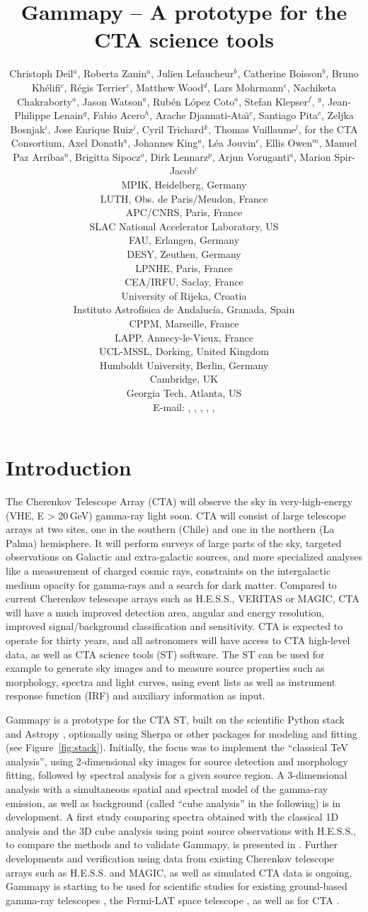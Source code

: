 \documentclass{PoS}
\title{Gammapy -- A prototype for the CTA science tools}
\author{
Christoph Deil$^a$,
Roberta Zanin$^a$,
Julien Lefaucheur$^b$,
Catherine Boisson$^b$,
Bruno Kh\'elifi$^c$,
R\'egis Terrier$^c$,
Matthew Wood$^d$,
Lars Mohrmann$^e$,
Nachiketa Chakraborty$^a$,
Jason Watson$^a$,
Rub\'en L\'opez Coto$^a$,
Stefan Klepser$^f$,
\speaker{Matteo Cerruti}$^g$,
Jean-Philippe Lenain$^g$,
Fabio Acero$^h$,
Arache Djannati-Ata{\"\i}$^c$,
Santiago Pita$^c$,
Zeljka Bosnjak$^i$,
Jose Enrique Ruiz$^j$,
Cyril Trichard$^k$,
Thomas Vuillaume$^l$,
for the CTA Consortium,
Axel Donath$^a$,
Johannes King$^a$,
L\'ea Jouvin$^c$,
Ellis Owen$^m$,
Manuel Paz Arribas$^n$,
Brigitta Sipocz$^o$,
Dirk Lennarz$^p$,
Arjun Voruganti$^a$,
Marion Spir-Jacob$^c$
\\
\llap{$^a$}MPIK, Heidelberg, Germany\\
\llap{$^b$}LUTH, Obs. de Paris/Meudon, France\\
\llap{$^c$}APC/CNRS, Paris, France\\
\llap{$^d$}SLAC National Accelerator Laboratory, US\\
\llap{$^e$}FAU, Erlangen, Germany\\
\llap{$^f$}DESY, Zeuthen, Germany\\
\llap{$^g$}LPNHE, Paris, France\\
\llap{$^h$}CEA/IRFU, Saclay, France\\
\llap{$^i$}University of Rijeka, Croatia\\
\llap{$^j$}Instituto Astrof\'isica de Andaluc\'ia, Granada, Spain\\
\llap{$^k$}CPPM, Marseille, France\\
\llap{$^l$}LAPP, Annecy-le-Vieux, France\\
\llap{$^m$}UCL-MSSL, Dorking, United Kingdom\\
\llap{$^n$}Humboldt University, Berlin, Germany\\
\llap{$^o$}Cambridge, UK\\
\llap{$^p$}Georgia Tech, Atlanta, US\\
E-mail:
\email{Christoph.Deil@mpi-hd.mpg.de},
\email{Roberta.Zanin@mpi-hd.mpg.de},
\email{julien.lefaucheur@obspm.fr},
\email{catherine.boisson@obspm.fr},
\email{khelifi@apc.in2p3.fr},
}
\begin{document}
\section{Introduction}
\label{sec:intro}

The Cherenkov Telescope Array (CTA) will observe the sky in very-high-energy
(VHE, E > 20$\,$GeV) gamma-ray light soon. CTA will consist of large telescope
arrays at two sites, one in the southern (Chile) and one in the northern (La
Palma) hemisphere. It will perform surveys of large parts of the sky, targeted
observations on Galactic and extra-galactic sources, and more specialized
analyses like a measurement of charged cosmic rays, constraints on the
intergalactic medium opacity for gamma-rays and a search for dark matter.
Compared to current Cherenkov telescope arrays such as H.E.S.S., VERITAS or
MAGIC, CTA will have a much improved detection area, angular and energy
resolution, improved signal/background classification and sensitivity. CTA is
expected to operate for thirty years, and all astronomers will have access to
CTA high-level data, as well as CTA science tools (ST) software. The ST can be
used for example to generate sky images and to measure source properties such as
morphology, spectra and light curves, using event lists as well as instrument
response function (IRF) and auxiliary information as input.

Gammapy is a prototype for the CTA ST, built on the scientific Python stack and
Astropy \cite{astropy}, optionally using Sherpa \cite{sherpa2001, sherpa2009,
sherpa2011} or other packages for modeling and fitting (see
Figure~\ref{fig:stack}). Initially, the focus was to implement the ``classical
TeV analysis'', using 2-dimensional sky images for source detection and
morphology fitting, followed by spectral analysis for a given source region. A
3\hbox{-}dimensional analysis with a simultaneous spatial and spectral model of
the gamma-ray emission, as well as background (called ``cube analysis'' in the
following) is in development.
A first study comparing spectra obtained with the classical 1D analysis and the
3D cube analysis using point source observations with H.E.S.S., to compare the
methods and to validate Gammapy, is presented in \cite{lea}. Further
developments and verification using data from existing Cherenkov telescope
arrays such as H.E.S.S. and MAGIC, as well as simulated CTA data is ongoing.
Gammapy is starting to be used for scientific studies for existing ground-based
gamma-ray telescopes \cite{hgps, shells}, the Fermi-LAT space telescope
\cite{owen2015}, as well as for CTA \cite{julien, roberta, cyril}.
\end{document}
